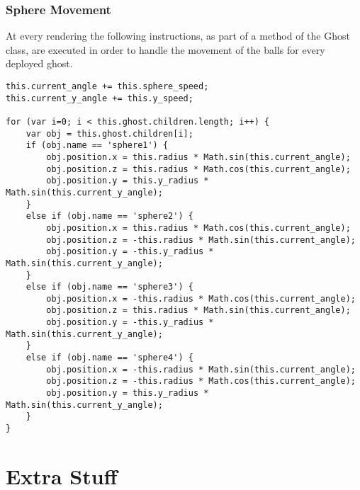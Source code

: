 \documentclass[a4paper,oneside]{report}
\begin{document}
\subsection{Sphere Movement}
At every rendering the following instructions, as part of a method of the Ghost class, are executed in order to handle the movement of the balls for every deployed ghost.
\begin{lstlisting}
this.current_angle += this.sphere_speed;
this.current_y_angle += this.y_speed;

for (var i=0; i < this.ghost.children.length; i++) {
    var obj = this.ghost.children[i];
    if (obj.name == 'sphere1') {
        obj.position.x = this.radius * Math.sin(this.current_angle);
        obj.position.z = this.radius * Math.cos(this.current_angle);
        obj.position.y = this.y_radius * Math.sin(this.current_y_angle);
    }
    else if (obj.name == 'sphere2') {
        obj.position.x = this.radius * Math.cos(this.current_angle);
        obj.position.z = -this.radius * Math.sin(this.current_angle);
        obj.position.y = -this.y_radius * Math.sin(this.current_y_angle);
    }
    else if (obj.name == 'sphere3') {
        obj.position.x = -this.radius * Math.cos(this.current_angle);
        obj.position.z = this.radius * Math.sin(this.current_angle);
        obj.position.y = -this.y_radius * Math.sin(this.current_y_angle);
    }
    else if (obj.name == 'sphere4') {
        obj.position.x = -this.radius * Math.sin(this.current_angle);
        obj.position.z = -this.radius * Math.cos(this.current_angle);
        obj.position.y = this.y_radius * Math.sin(this.current_y_angle);
    }
}
\end{lstlisting}

\chapter{Extra Stuff}
\end{document}

